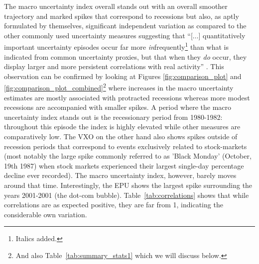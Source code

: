 \documentclass[a4paper,11pt,listof=nochaptergap,oneside,pointednumbers,bibtotoc,bigheadings,liststotoc,hidelinks]{scrbook}
\theoremstyle{mysatz}
\theoremstyle{mydefinition}
\theoremstyle{mytheorem}
\theoremstyle{mybemerkung}
\begin{document}
The macro uncertainty index overall stands out with an overall smoother trajectory and marked spikes that correspond to recessions but also, as aptly formulated by \citet{juradoetal:15} themselves, significant independent variation as compared to the other commonly used uncertainty measures suggesting that ``[...] quantitatively important uncertainty episodes occur far more \textit{in}frequently\footnote{Italics added.} than what is indicated from common uncertainty proxies, but that when they \textit{do} occur, they display larger and more persistent correlations with real activity'' \citep[p. 1181]{juradoetal:15}. This observation can be confirmed by looking at Figures \ref{fig:comparison_plot} and \ref{fig:comparison_plot_combined}\footnote{And also Table~\ref{tab:summary_stats1} which we will discuss below.} where increases in the macro uncertainty estimates are mostly associated with protracted recessions whereas more modest recessions are accompanied with smaller spikes. A period where the macro uncertainty index stands out is the recessionary period from 1980-1982: throughout this episode the index is highly elevated while other measures are comparatively low. The VXO on the other hand also shows spikes outside of recession periods that correspond to events exclusively related to stock-markets (most notably the large spike commonly referred to as 'Black Monday' (October, 19th 1987) when stock markets experienced their largest single-day percentage decline ever recorded). The macro uncertainty index, however, barely moves around that time. Interestingly, the EPU shows the largest spike surrounding the years 2001-2001 (the dot-com bubble). Table~\ref{tab:correlations} shows that while correlations are as expected positive, they are far from 1, indicating the considerable own variation. 

\begin{table}[t]
\centering
\caption[Correlation matrix of uncertainty measures.]{Correlation matrix of the uncertainty measures from Figure~\ref{fig:comparison_plot}.}
\label{tab:correlations}
\end{table}
\end{document}
